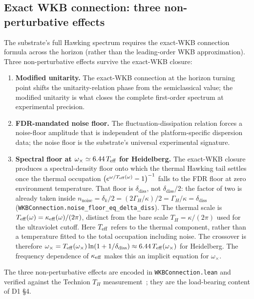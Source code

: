 \documentclass[aps,prd,reprint,nofootinbib,superscriptaddress]{revtex4-2}
\begin{document}
\subsection{Exact WKB connection: three non-perturbative effects}

The substrate's full Hawking spectrum requires the exact-WKB
connection formula across the horizon (rather than the leading-order
WKB approximation). Three non-perturbative effects survive the
exact-WKB closure:

\begin{enumerate}
\item \textbf{Modified unitarity.} The exact-WKB connection at the
  horizon turning point shifts the unitarity-relation phase from the
  semiclassical value; the modified unitarity is what closes the
  complete first-order spectrum at experimental precision.
\item \textbf{FDR-mandated noise floor.} The
  fluctuation-dissipation relation forces a noise-floor amplitude
  that is independent of the platform-specific dispersion data; the
  noise floor is the substrate's universal experimental signature.
\item \textbf{Spectral floor at $\omega_\times \simeq 6.44\,T_{\rm eff}$ for Heidelberg.}
  The exact-WKB closure produces a spectral-density floor onto which
  the thermal Hawking tail settles once the thermal occupation
  $\left(e^{\omega/T_{\rm eff}(\omega)}-1\right)^{-1}$ falls to the FDR floor at zero environment temperature. That floor
  is $\delta_{\mathrm{diss}}$, not $\delta_{\mathrm{diss}}/2$: the
  factor of two is already taken inside
  $n_{\mathrm{noise}} = \delta_k/2 = (2\Gamma_H/\kappa)/2 = \Gamma_H/\kappa
  = \delta_{\mathrm{diss}}$
  (\texttt{WKBConnection.noise\_floor\_eq\_delta\_diss}). The thermal scale is
  $T_{\rm eff}(\omega) = \kappa_{\rm eff}(\omega)/(2\pi)$, distinct from
  the bare scale $T_H = \kappa/(2\pi)$ used for the ultraviolet cutoff.
  Here $T_{\rm eff}$ refers to the thermal component, rather than a
  temperature fitted to the total occupation including noise. The crossover is
  therefore
  $\omega_\times = T_{\rm eff}(\omega_\times) \ln\!\left(1 + 1/\delta_{\mathrm{diss}}\right)
  \approx 6.44\, T_{\rm eff}(\omega_\times)$ for Heidelberg.
  The frequency dependence of $\kappa_{\rm eff}$ makes this an implicit
  equation for $\omega_\times$.
\end{enumerate}

The three non-perturbative effects are encoded in
\texttt{WKBConnection.lean} and verified against the Technion
$T_H$ measurement~\cite{deNova2019}; they are the load-bearing
content of D1 \S 4.
\end{document}
